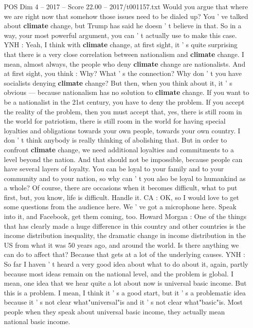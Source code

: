 \begin{textsample}{POS Dim 4 – 2017 – Score 22.00 – 2017/t001157.txt}
Would you argue that where we are right now that somehow those issues need to be dialed up?
You ' ve talked about \textbf{climate} change, but Trump has said he doesn ' t believe in that.
So in a way, your most powerful argument, you can ' t actually use to make this case.
YNH : Yeah, I think with \textbf{climate} change, at first sight, it ' s quite surprising that there is a very close correlation between nationalism and \textbf{climate} change.
I mean, almost always, the people who deny \textbf{climate} change are nationalists.
And at first sight, you think : Why?
What ' s the connection?
Why don ' t you have socialists denying \textbf{climate} change?
But then, when you think about it, it ' s obvious — because nationalism has no solution to \textbf{climate} change.
If you want to be a nationalist in the 21st century, you have to deny the problem.
If you accept the reality of the problem, then you must accept that, yes, there is still room in the world for patriotism, there is still room in the world for having special loyalties and obligations towards your own people, towards your own country.
I don ' t think anybody is really thinking of abolishing that.
But in order to confront \textbf{climate} change, we need additional loyalties and commitments to a level beyond the nation.
And that should not be impossible, because people can have several layers of loyalty.
You can be loyal to your family and to your community and to your nation, so why can ' t you also be loyal to humankind as a whole?
Of course, there are occasions when it becomes difficult, what to put first, but, you know, life is difficult.
Handle it.
CA : OK, so I would love to get some questions from the audience here.
We ' ve got a microphone here.
Speak into it, and Facebook, get them coming, too.
Howard Morgan : One of the things that has clearly made a huge difference in this country and other countries is the income distribution inequality, the dramatic change in income distribution in the US from what it was 50 years ago, and around the world.
Is there anything we can do to affect that?
Because that gets at a lot of the underlying causes.
YNH : So far I haven ' t heard a very good idea about what to do about it, again, partly because most ideas remain on the national level, and the problem is global.
I mean, one idea that we hear quite a lot about now is universal basic income.
But this is a problem.
I mean, I think it ' s a good start, but it ' s a problematic idea because it ' s not clear what"universal"is and it ' s not clear what"basic"is.
Most people when they speak about universal basic income, they actually mean national basic income.

\end{textsample}
